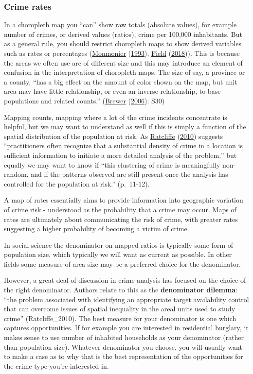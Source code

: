\documentclass[
]{book}
\begin{document}
\hypertarget{crime-rates}{%
\subsubsection{Crime rates}\label{crime-rates}}

In a choropleth map you ``can'' show raw totals (absolute values), for example number of crimes, or derived values (ratios), crime per 100,000 inhabitants. But as a general rule, you should restrict choropleth maps to show derived variables such as rates or percentages (\protect\hyperlink{ref-Monmonier_1993}{Monmonier} (\protect\hyperlink{ref-Monmonier_1993}{1993}), \protect\hyperlink{ref-Field_2018}{Field} (\protect\hyperlink{ref-Field_2018}{2018})). This is because the areas we often use are of different size and this may introduce an element of confusion in the interpretation of choropleth maps. The size of say, a province or a county, ``has a big effect on the amount of color shown on the map, but unit area may have little relationship, or even an inverse relationship, to base populations and related counts.'' (\protect\hyperlink{ref-Brewer_2006}{Brewer} (\protect\hyperlink{ref-Brewer_2006}{2006}): S30)

Mapping counts, mapping where a lot of the crime incidents concentrate is helpful, but we may want to understand as well if this is simply a function of the spatial distribution of the population at risk. As \protect\hyperlink{ref-Ratcliffe_2010}{Ratcliffe} (\protect\hyperlink{ref-Ratcliffe_2010}{2010}) suggests ``practitioners often recognize that a substantial density of crime in a location is sufficient information to initiate a more detailed analysis of the problem,'' but equally we may want to know if ``this clustering of crime is meaningfully non-random, and if the patterns observed are still present once the analysis has controlled for the population at risk.'' (p.~11-12).

A map of rates essentially aims to provide information into geographic variation of crime risk - understood as the probability that a crime may occur. Maps of rates are ultimately about communicating the risk of crime, with greater rates suggesting a higher probability of becoming a victim of crime.

In social science the denominator on mapped ratios is typically some form of population size, which typically we will want as current as possible. In other fields some measure of area size may be a preferred choice for the denominator.

However, a great deal of discussion in crime analysis has focused on the choice of the right denominator. Authors relate to this as the \textbf{denominator dilemma}: ``the problem associated with identifying an appropriate target availability control that can overcome issues of spatial inequality in the areal units used to study crime'' (Ratcliffe\_2010). The best measure for your denominator is one which captures opportunities. If for example you are interested in residential burglary, it makes sense to use number of inhabited households as your denominator (rather than population size). Whatever denominator you choose, you will usually want to make a case as to why that is the best representation of the opportunities for the crime type you're interested in.
\end{document}
